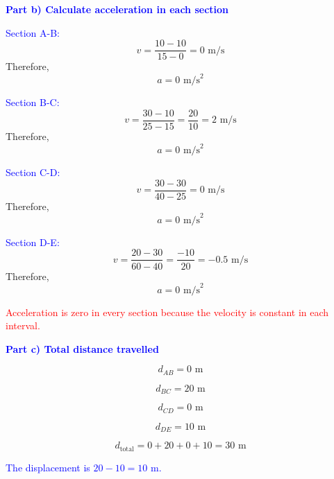 \begin{exercise}
\begin{solu}
        \textbf{\textcolor{blue}{Part b) Calculate acceleration in each section}}

        \textcolor{blue}{Section A-B:}
        \[
        v=\frac{10-10}{15-0}=0\text{ m/s}
        \]
        Therefore,
        \[
        \boxed{a=0\text{ m/s}^2}
        \]

        \textcolor{blue}{Section B-C:}
        \[
        v=\frac{30-10}{25-15}=\frac{20}{10}=2\text{ m/s}
        \]
        Therefore,
        \[
        \boxed{a=0\text{ m/s}^2}
        \]

        \textcolor{blue}{Section C-D:}
        \[
        v=\frac{30-30}{40-25}=0\text{ m/s}
        \]
        Therefore,
        \[
        \boxed{a=0\text{ m/s}^2}
        \]

        \textcolor{blue}{Section D-E:}
        \[
        v=\frac{20-30}{60-40}=\frac{-10}{20}=-0.5\text{ m/s}
        \]
        Therefore,
        \[
        \boxed{a=0\text{ m/s}^2}
        \]

        \textcolor{red}{Acceleration is zero in every section because the velocity is constant in each interval.}

        \vspace{0.5cm}

        \textbf{\textcolor{blue}{Part c) Total distance travelled}}

        \[
        d_{AB}=0\text{ m}
        \]

        \[
        d_{BC}=20\text{ m}
        \]

        \[
        d_{CD}=0\text{ m}
        \]

        \[
        d_{DE}=10\text{ m}
        \]

        \[
        d_{\text{total}}=0+20+0+10=\boxed{30\text{ m}}
        \]

        \textcolor{blue}{The displacement is $20-10=10$ m.}
    \end{solu}
\end{exercise}

